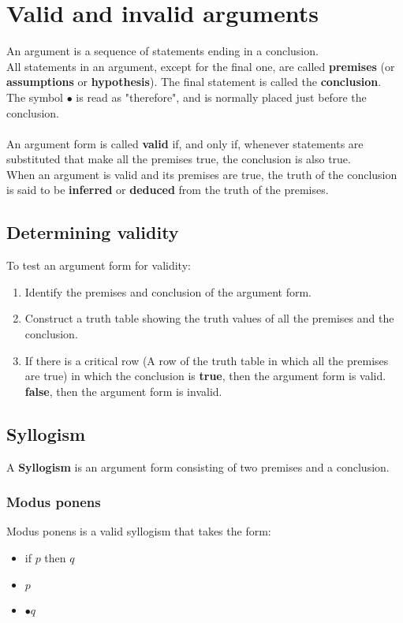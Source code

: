\documentclass[a4paper]{article}
\begin{document}
\section{Valid and invalid arguments}
An argument is a sequence of statements ending in a conclusion.\\
All statements in an argument, except for the final one, are called \textbf{premises} (or \textbf{assumptions} or \textbf{hypothesis}). The final statement is called the \textbf{conclusion}.\\
The symbol $\bullet$ is read as "therefore", and is normally placed just before the conclusion.\\ \\
An argument form is called \textbf{valid} if, and only if, whenever statements are substituted that make all the premises true, the conclusion is also true.\\
When an argument is valid and its premises are true, the truth of the conclusion is said to be \textbf{inferred} or \textbf{deduced} from the truth of the premises.
\subsection{Determining validity}
To test an argument form for validity:
\begin{enumerate}
	\item Identify the premises and conclusion of the argument form.
	\item Construct a truth table showing the truth values of all the premises and the conclusion.
	\item If there is a critical row (A row of the truth table in which all the premises are true) in which the conclusion is 
	\subitem \textbf{true}, then the argument form is valid.
	\subitem \textbf{false}, then the argument form is invalid.
\end{enumerate}
\subsection{Syllogism}
A \textbf{Syllogism} is an argument form consisting of two premises and a conclusion.
\subsubsection{Modus ponens}
Modus ponens is a valid syllogism that takes the form:
\begin{itemize}
	\itemsep0em
	\item[] if $p$ then $q$
	\item[] $p$
	\item[] $\bullet q$
\end{itemize}
\end{document}
